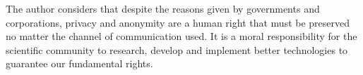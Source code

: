 \documentclass[conference]{IEEEtran}
\begin{document}
The author considers that despite the reasons given by governments and corporations, privacy and anonymity are a human right that must be preserved no matter the channel of communication used. It is a moral responsibility for the scientific community to research, develop and implement better technologies to guarantee our fundamental rights.




























{}

\end{document}
